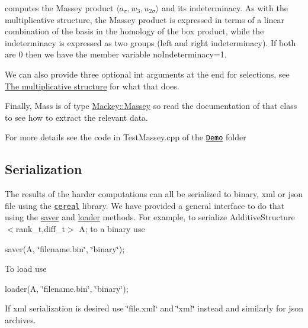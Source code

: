 computes the Massey product $\langle a_{\sigma},w_3,u_{2\sigma}\rangle $ and its indeterminacy. As with the multiplicative structure, the Massey product is expressed in terms of a linear combination of the basis in the homology of the box product, while the indeterminacy is expressed as two groups (left and right indeterminacy). If both are $0$ then we have the member variable {\ttfamily no\+Indeterminacy=1}.

We can also provide three optional {\ttfamily int} arguments at the end for selections, see \hyperlink{use_step1mult}{The multiplicative structure} for what that does.

Finally, {\ttfamily Mass} is of type {\ttfamily \hyperlink{classMackey_1_1Massey}{Mackey\+::\+Massey}} so read the documentation of that class to see how to extract the relevant data.

For more details see the code in Test\+Massey.\+cpp of the \href{https://github.com/NickG-Math/Mackey/tree/master/Demo}{\tt Demo} folder\hypertarget{use_step1Cer}{}\subsection{Serialization}\label{use_step1Cer}
The results of the harder computations can all be serialized to binary, xml or json file using the \href{https://uscilab.github.io/cereal}{\tt cereal} library. We have provided a general interface to do that using the \hyperlink{namespaceMackey_a1824d780ce15f1845e4f87bf056feec9}{saver} and \hyperlink{namespaceMackey_a735958355cdca12e0d312b7e604f28bc}{loader} methods. For example, to serialize {\ttfamily Additive\+Structure$<$rank\+\_\+t,diff\+\_\+t$>$ A;} to a binary use

{\ttfamily saver(A, \char`\"{}filename.\+bin\char`\"{}, \char`\"{}binary\char`\"{});}

To load use

{\ttfamily loader(A, \char`\"{}filename.\+bin\char`\"{}, \char`\"{}binary\char`\"{});}

If {\ttfamily xml} serialization is desired use \char`\"{}file.\+xml\char`\"{} and \char`\"{}xml\char`\"{} instead and similarly for json archives. 